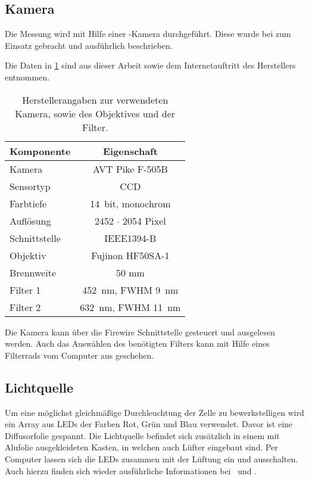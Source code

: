 \subsection{Kamera}
\label{sec:cam}
Die Messung wird mit Hilfe einer -Kamera durchgeführt. Diese wurde  bei \cite{heberle} zum Einsatz gebracht und ausführlich beschrieben. 

Die Daten in \ref{tab:cam} sind aus dieser Arbeit sowie dem Internetauftritt des Herstellers \citep{pike_sheet} entnommen. 
\begin{table}[h]
 \begin{tabularx}{\linewidth}{X|c}
  Komponente	& Eigenschaft \\
  \hline\hline
  Kamera	& AVT Pike F-505B \\
  Sensortyp	& CCD \\
  Farbtiefe	& \SI{14}{bit}, monochrom \\
  Auflösung	& 2452 $\cdot$ 2054 Pixel \\
  Schnittstelle	& IEEE1394-B \\
  \hline
  Objektiv	& Fujinon HF50SA-1 \\
  Brennweite	& 50 mm \\
  \hline
  Filter 1	& \SI{452}{\nano\meter}, FWHM \SI{9}{\nano\meter} \\
  Filter 2	& \SI{632}{\nano\meter}, FWHM \SI{11}{\nano\meter} 
 \end{tabularx}
 \caption{Herstellerangaben zur verwendeten Kamera, sowie des Objektives und der Filter.}
 \label{tab:cam}
\end{table}
Die Kamera kann über die Firewire Schnittstelle gesteuert und ausgelesen werden. Auch das Auswählen des benötigten Filters kann mit Hilfe eines Filterrads vom Computer aus geschehen.

\subsection{Lichtquelle}
\label{sec:light}
Um eine möglichst gleichmäßige Durchleuchtung der Zelle zu bewerkstelligen wird ein Array aus LEDs der Farben Rot, Grün und Blau verwendet. Davor ist eine Diffusorfolie gespannt. Die Lichtquelle befindet sich zusätzlich in einem mit Alufolie ausgekleideten Kasten, in welchen auch Lüfter eingebaut sind. Per Computer lassen sich die LEDs zusammen mit der Lüftung ein und ausschalten. Auch hierzu finden sich wieder ausführliche Informationen bei \cite{buchner}\ und \cite{heberle}.


